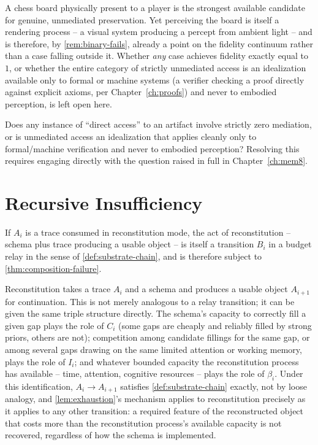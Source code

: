 A chess board physically present to a player is the strongest available
candidate for genuine, unmediated preservation. Yet perceiving the board
is itself a rendering process -- a visual system producing a percept from
ambient light -- and is therefore, by \cref{rem:binary-fails}, already a
point on the fidelity continuum rather than a case falling outside it.
Whether \emph{any} case achieves fidelity exactly equal to $1$, or
whether the entire category of strictly unmediated access is an
idealization available only to formal or machine systems (a verifier
checking a proof directly against explicit axioms, per
Chapter~\ref{ch:proofs}) and never to embodied perception, is left open
here.

\begin{openquestion}
\label{oq:unmediated-access}
Does any instance of ``direct access'' to an artifact involve strictly
zero mediation, or is unmediated access an idealization that applies
cleanly only to formal/machine verification and never to embodied
perception? Resolving this requires engaging directly with the question
raised in full in Chapter~\ref{ch:mem8}.
\end{openquestion}

\section{Recursive Insufficiency}

\begin{proposition}
\label{prop:recursive-insufficiency}
If $A_i$ is a trace consumed in reconstitution mode, the act of
reconstitution -- schema plus trace producing a usable object -- is
itself a transition $B_i$ in a budget relay in the sense of
\cref{def:substrate-chain}, and is therefore subject to
\cref{thm:composition-failure}.
\end{proposition}

\begin{proofsketch}
Reconstitution takes a trace $A_i$ and a schema and produces a usable
object $A_{i+1}$ for continuation. This is not merely analogous to a
relay transition; it can be given the same triple structure directly.
The schema's capacity to correctly fill a given gap plays the role of
$C_i$ (some gaps are cheaply and reliably filled by strong priors, others
are not); competition among candidate fillings for the same gap, or
among several gaps drawing on the same limited attention or working
memory, plays the role of $I_i$; and whatever bounded capacity the
reconstitution process has available -- time, attention, cognitive
resources -- plays the role of $\beta_i$. Under this identification,
$A_i \to A_{i+1}$ satisfies \cref{def:substrate-chain} exactly, not by
loose analogy, and \cref{lem:exhaustion}'s mechanism applies to
reconstitution precisely as it applies to any other transition: a
required feature of the reconstructed object that costs more than the
reconstitution process's available capacity is not recovered, regardless
of how the schema is implemented.
\end{proofsketch}

